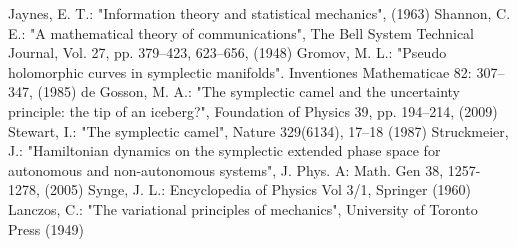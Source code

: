 \documentclass[twocolumn,floatfix,nofootinbib]{revtex4}   %
\theoremstyle{theorem}
\theoremstyle{definition}
\begin{document}
\begin{thebibliography}{5}

 Jaynes, E. T.: "Information theory and statistical mechanics", (1963)
 Shannon, C. E.: "A mathematical theory of communications", The Bell System Technical Journal, Vol. 27, pp. 379–423, 623–656, (1948)
 Gromov, M. L.: "Pseudo holomorphic curves in symplectic manifolds". Inventiones Mathematicae 82: 307–347, (1985)
 de Gosson, M. A.: "The symplectic camel and the uncertainty principle: the tip of an iceberg?", Foundation of Physics 39, pp. 194–214, (2009)
 Stewart, I.: "The symplectic camel", Nature 329(6134), 17–18 (1987)
 Struckmeier, J.: "Hamiltonian dynamics on the symplectic extended phase space for autonomous and non-autonomous systems", J. Phys. A: Math. Gen 38, 1257-1278, (2005)
 Synge, J. L.: Encyclopedia of Physics Vol 3/1, Springer (1960)
 Lanczos, C.: "The variational principles of mechanics", University of Toronto Press (1949)

\end{thebibliography}
\end{document}
